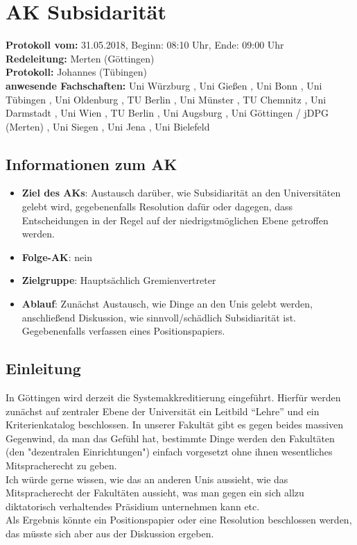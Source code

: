 
\section{AK Subsidarität}

  \textbf{Protokoll vom:} 31.05.2018,
  Beginn: 08:10 Uhr,
  Ende: 09:00 Uhr \\
  \textbf{Redeleitung:} Merten (Göttingen) \\
  \textbf{Protokoll:} Johannes (Tübingen) \\
  \textbf{anwesende Fachschaften:} Uni Würzburg , Uni Gießen , Uni Bonn , Uni Tübingen , Uni Oldenburg , TU Berlin , Uni Münster , TU Chemnitz , Uni Darmstadt , Uni Wien , TU Berlin , Uni Augsburg , Uni Göttingen / jDPG (Merten) , Uni Siegen , Uni Jena , Uni Bielefeld

  \subsection*{Informationen zum AK}
    \begin{itemize}
      \item \textbf{Ziel des AKs}: Austausch darüber, wie Subsidiarität an den Universitäten gelebt wird, gegebenenfalls Resolution dafür oder dagegen, dass Entscheidungen in der Regel auf der niedrigstmöglichen Ebene getroffen werden.
      \item \textbf{Folge-AK}: nein
      \item \textbf{Zielgruppe}: Hauptsächlich Gremienvertreter
      \item \textbf{Ablauf}: Zunächst Austausch, wie Dinge an den Unis gelebt werden, anschließend Diskussion, wie sinnvoll/schädlich Subsidiarität ist. Gegebenenfalls verfassen eines Positionspapiers.
    \end{itemize}

  \subsection*{Einleitung}
    In Göttingen wird derzeit die Systemakkreditierung eingeführt. Hierfür werden zunächst auf zentraler Ebene der Universität ein Leitbild ``Lehre'' und ein Kriterienkatalog beschlossen. In unserer Fakultät gibt es gegen beides massiven Gegenwind, da man das Gefühl hat, bestimmte Dinge werden den Fakultäten (den "dezentralen Einrichtungen") einfach vorgesetzt ohne ihnen wesentliches Mitspracherecht zu geben. \\
    Ich würde gerne wissen, wie das an anderen Unis aussieht, wie das Mitspracherecht der Fakultäten aussieht, was man gegen ein sich allzu diktatorisch verhaltendes Präsidium unternehmen kann etc. \\
    Als Ergebnis könnte ein Positionspapier oder eine Resolution beschlossen werden, das müsste sich aber aus der Diskussion ergeben.

